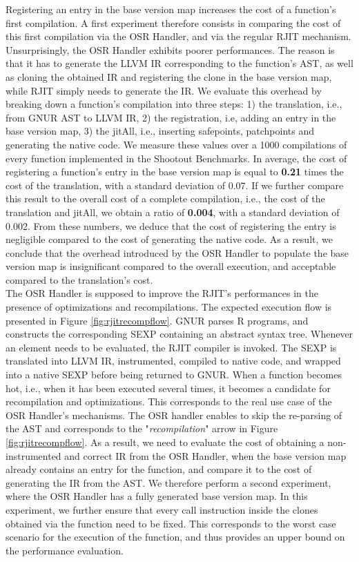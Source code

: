 Registering an entry in the base version map increases the cost of a function's first compilation.
A first experiment therefore consists in comparing the cost of this first compilation via the OSR Handler, and via the regular RJIT mechanism. 
Unsurprisingly, the OSR Handler exhibits poorer performances. 
The reason is that it has to generate the LLVM IR corresponding to the function's AST, as well as cloning the obtained IR and registering the clone in the base version map, while RJIT simply needs to generate the IR.
We evaluate this overhead by breaking down a function's compilation into three steps: 1) the translation, i.e., from GNUR AST to LLVM IR, 2) the registration, i.e, adding an entry in the base version map, 3) the jitAll, i.e., inserting safepoints, patchpoints and generating the native code.
We measure these values over a 1000 compilations of every function implemented in the Shootout Benchmarks.
In average, the cost of registering a function's entry in the base version map is equal to \textbf{0.21} times the cost of the translation, with a standard deviation of 0.07.
If we further compare this result to the overall cost of a complete compilation, i.e., the cost of the translation and jitAll, we obtain a ratio of \textbf{0.004}, with a standard deviation of 0.002. 
From these numbers, we deduce that the cost of registering the entry is negligible compared to the cost of generating the native code.   
As a result, we conclude that the overhead introduced by the OSR Handler to populate the base version map is insignificant compared to the overall execution, and acceptable compared to the translation's cost.\\


The OSR Handler is supposed to improve the RJIT's performances in the presence of optimizations and recompilations.
The expected execution flow is presented in Figure \ref{fig:rjitrecompflow}.
GNUR parses R programs, and constructs the corresponding SEXP containing an abstract syntax tree.
Whenever an element needs to be evaluated, the RJIT compiler is invoked. 
The SEXP is translated into LLVM IR, instrumented, compiled to native code, and wrapped into a native SEXP before being returned to GNUR.
When a function becomes hot, i.e., when it has been executed several times, it becomes a candidate for recompilation and optimizations.
This corresponds to the real use case of the OSR Handler's mechanisms.
The OSR handler enables to skip the re-parsing of the AST and corresponds to the "\textit{recompilation}" arrow in Figure \ref{fig:rjitrecompflow}.
As a result, we need to evaluate the cost of obtaining a non-instrumented and correct IR from the OSR Handler, when the base version map already contains an entry for the function, and compare it to the cost of generating the IR from the AST.
We therefore perform a second experiment, where the OSR Handler has a fully generated base version map.
In this experiment, we further ensure that every call instruction inside the clones obtained via the  function need to be fixed.
This corresponds to the worst case scenario for the execution of the  function, and thus provides an upper bound on the performance evaluation.\\

